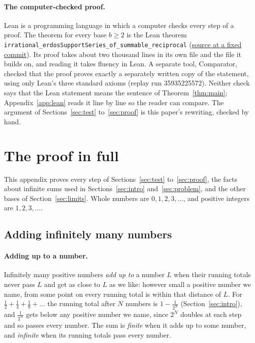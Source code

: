 \documentclass[10pt]{article}
\theoremstyle{plain}
\theoremstyle{definition}
\theoremstyle{remark}
\begin{document}
\paragraph{The computer-checked proof.} Lean is a programming language in which
a computer checks every step of a proof. The theorem for every base $b\ge2$ is
the Lean theorem \texttt{irrational\_erdosSupportSeries\_of\_summable\_reciprocal}
(\href{https://github.com/wcook04/plectis-erdos/blob/436f55ebdafa67e4af0fff79f621c13f2ded12bf/lean/Erdos249257/AllBaseReciprocalSupportIrrationality.lean#L395}{source at a fixed commit}).
Its proof takes about two thousand lines in its own file and the file it
builds on, and reading it takes fluency in Lean. A separate tool, Comparator,
checked that the proof proves exactly a separately written copy of the
statement, using only Lean's three standard axioms (replay run 35935225572).
Neither check says that the Lean statement means the sentence of
Theorem~\ref{thm:main}; Appendix~\ref{app:lean} reads it line by line so the
reader can compare. The argument of Sections~\ref{sec:test}
to~\ref{sec:proof} is this paper's rewriting, checked by hand.

\appendix

\section{The proof in full}\label{app:full}

This appendix proves every step of Sections~\ref{sec:test}
to~\ref{sec:proof}, the facts about infinite sums used in
Sections~\ref{sec:intro} and~\ref{sec:problem}, and the other bases of
Section~\ref{sec:limits}. Whole numbers are $0,1,2,3,\dots$, and positive integers
are $1,2,3,\dots$.

\subsection{Adding infinitely many numbers}\label{app:sums}

\paragraph{Adding up to a number.} Infinitely many positive numbers \emph{add
up to} a number $L$ when their running totals never pass $L$ and get as close
to $L$ as we like: however small a positive number we name, from some point
on every running total is within that distance of $L$. For
$\tfrac12+\tfrac14+\tfrac18+\dots$ the running total after $N$ numbers is
$1-\tfrac1{2^N}$ (Section~\ref{sec:intro}), and $\tfrac1{2^N}$ gets below any
positive number we name, since $2^N$ doubles at each step and so passes every
number. The sum is \emph{finite} when it adds up to some number, and
\emph{infinite} when its running totals pass every number.
\end{document}
